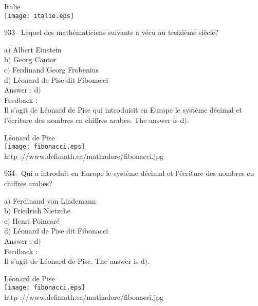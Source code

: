 ﻿\documentclass[letterpaper, 12pt]{article}
\begin{document}
        \begin{center}
        Italie\\
    \texttt{[image: italie.eps]}\\
    \end{center}

933-- Lequel des math\'ematiciens suivants a v\'ecu au treizi\`eme
si\`ecle?

a$)$ Albert Einstein \\
b$)$ Georg Cantor \\
c$)$ Ferdinand Georg Frobenius \\
d$)$ L\'eonard de Pise dit Fibonacci\\

Answer : d$)$\\

Feedback :\\
Il s'agit de L\'eonard de Pise qui introduisit en Europe le
syst\`eme d\'ecimal et l'\'ecriture
des nombres en chiffres arabes. The answer is d$)$.\\

        \begin{center}
        L\'eonard de Pise\\
    \texttt{[image: fibonacci.eps]}\\
        {\footnotesize http ://www.defimath.ca/mathadore/fibonacci.jpg}
    \end{center}

934-- Qui a introduit en Europe le syst\`eme d\'ecimal et
l'\'ecriture des nombres en chiffres arabes?

a$)$ Ferdinand von Lindemann \\
b$)$ Friedrich Nietzche \\
c$)$ Henri Poincar\'e \\
d$)$ L\'eonard de Pise dit Fibonacci\\

Answer : d$)$\\

Feedback : \\
Il s'agit de L\'eonard de Pise. The answer is d$)$.

        \begin{center}
        L\'eonard de Pise\\
    \texttt{[image: fibonacci.eps]}\\
        {\footnotesize http ://www.defimath.ca/mathadore/fibonacci.jpg}
    \end{center}
\end{document}
